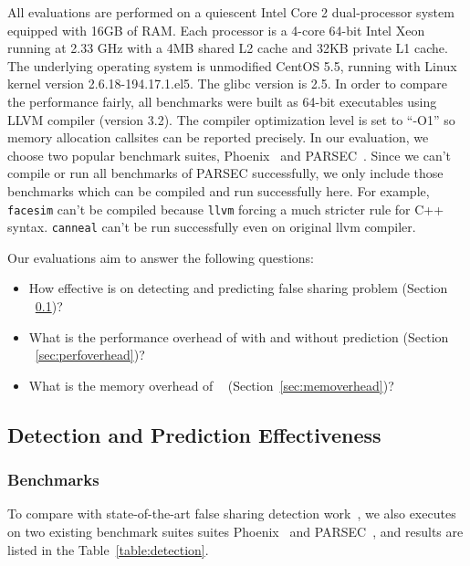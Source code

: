 \label{sec:evaluation}

All evaluations are performed on a quiescent Intel Core 2 dual-processor system equipped with 
16GB of RAM. 
Each processor is a 4-core 64-bit Intel Xeon running at 2.33 GHz with a 4MB
shared L2 cache and 32KB private L1 cache. 
The underlying operating system is unmodified CentOS 5.5, running with Linux kernel
version 2.6.18-194.17.1.el5. The glibc version is 2.5. 
In order to compare the performance fairly, all benchmarks were built as 64-bit executables 
using LLVM compiler (version 3.2). The compiler optimization level is set to ``-O1'' 
so memory allocation callsites can be reported precisely.
In our evaluation, we choose two popular benchmark suites, Phoenix~\cite{phoenix-hpca} and PARSEC~\cite{parsec}. Since we can't compile or run all benchmarks of PARSEC successfully, we only include those benchmarks which can be compiled and run successfully here. For example, \texttt{facesim} can't be compiled 
because \texttt{llvm} forcing a much stricter rule for C++ syntax. \texttt{canneal} can't be run successfully even on original llvm compiler.

Our evaluations aim to answer the following questions:
\begin{itemize}
\item
  How effective is \Predator{} on detecting and predicting false sharing problem (Section ~\ref{sec:effective})?

\item
  What is the performance overhead of \Predator{} with and without prediction
  (Section ~\ref{sec:perfoverhead})?

\item
  What is the memory overhead of \Predator{}~ (Section~\ref{sec:memoverhead})?
\end{itemize}


\subsection{Detection and Prediction Effectiveness}
\label{sec:effective}

\subsubsection{Benchmarks}
To compare with state-of-the-art false sharing detection work~\cite{sheriff, OSdetection}, 
we also executes \Predator{} on two existing benchmark suites 
suites Phoenix~\cite{phoenix-hpca} and PARSEC~\cite{parsec}, 
and results are listed in the Table~\ref{table:detection}. 

